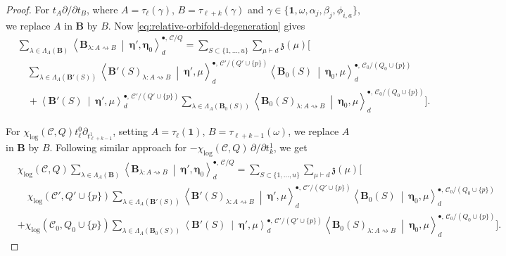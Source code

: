 \documentclass[10pt,a4paper]{amsart}
\newcommand{\cC}{\mathcal C}
\newcommand{\id}{\mathbf 1}
\begin{document}
\begin{proof}
For \(t_A\partial/\partial t_B\), where \(A=\tau_\ell(\gamma)\), \(B=\tau_{\ell+k}(\gamma)\) and
\(\gamma\in\{\id,\omega,\alpha_j,\beta_j,\phi_{i,a}\}\), we replace
\(A\) in \(\mathbf B\) by \(B\).  Now \eqref{eq:relative-orbifold-degeneration} gives
\[
\begin{aligned}
&\sum_{\lambda\in\Lambda_A(\mathbf B)}
 \left\langle\mathbf B_{\lambda:A\rightsquigarrow B}
 \ \middle|\ \boldsymbol\eta',\boldsymbol\eta_0\right\rangle_d^{\bullet,\,\cC/Q}
={}\sum_{S\subset\{1,\ldots,u\}}\sum_{\mu\vdash d}\mathfrak z(\mu)\Bigg[
\\[-2mm]
&\quad\sum_{\lambda\in\Lambda_A(\mathbf B'(S))}
 \left\langle\mathbf B'(S)_{\lambda:A\rightsquigarrow B}
 \ \middle|\ \boldsymbol\eta',\mu\right\rangle_d^{\bullet,\,\cC'/(Q'\cup\{p\})}
 \left\langle\mathbf B_0(S)\ \middle|\ \boldsymbol\eta_0,\mu\right\rangle_d^{\bullet,\,\cC_0/(Q_0\cup\{p\})}
\\[-1mm]
&\quad+\left\langle\mathbf B'(S)\ \middle|\ \boldsymbol\eta',\mu\right\rangle_d^{\bullet,\,\cC'/(Q'\cup\{p\})}
 \sum_{\lambda\in\Lambda_A(\mathbf B_0(S))}
 \left\langle\mathbf B_0(S)_{\lambda:A\rightsquigarrow B}
 \ \middle|\ \boldsymbol\eta_0,\mu\right\rangle_d^{\bullet,\,\cC_0/(Q_0\cup\{p\})}\Bigg].
\end{aligned}
\]

For \(\chi_{\log}(\cC,Q)t^0_\ell\partial_{t^1_{\ell+k-1}}\), setting
\(A=\tau_\ell(\id)\), \(B=\tau_{\ell+k-1}(\omega)\), we replace \(A\) in $\mathbf B$ by \(B\).
Following similar approach for \(-\chi_{\log}(\cC,Q)\,\partial/\partial t^1_k\), we get
\[
\begin{aligned}
&\chi_{\log}(\cC,Q)\sum_{\lambda\in\Lambda_A(\mathbf B)}
 \left\langle\mathbf B_{\lambda:A\rightsquigarrow B}
 \ \middle|\ \boldsymbol\eta',\boldsymbol\eta_0\right\rangle_d^{\bullet,\,\cC/Q}
={}\sum_{S\subset\{1,\ldots,u\}}\sum_{\mu\vdash d}\mathfrak z(\mu)\Bigg[
\\[-2mm]
&\quad\chi_{\log}(\cC',Q'\cup\{p\})
 \sum_{\lambda\in\Lambda_A(\mathbf B'(S))}
 \left\langle\mathbf B'(S)_{\lambda:A\rightsquigarrow B}
 \ \middle|\ \boldsymbol\eta',\mu\right\rangle_d^{\bullet,\,\cC'/(Q'\cup\{p\})}
 \left\langle\mathbf B_0(S)\ \middle|\ \boldsymbol\eta_0,\mu\right\rangle_d^{\bullet,\,\cC_0/(Q_0\cup\{p\})}
\\[-2mm]
&+\chi_{\log}(\cC_0,Q_0\cup\{p\})
 \sum_{\lambda\in\Lambda_A(\mathbf B_0(S))}
 \left\langle\mathbf B'(S)\ \middle|\ \boldsymbol\eta',\mu\right\rangle_d^{\bullet,\,\cC'/(Q'\cup\{p\})}
 \left\langle\mathbf B_0(S)_{\lambda:A\rightsquigarrow B}
 \ \middle|\ \boldsymbol\eta_0,\mu\right\rangle_d^{\bullet,\,\cC_0/(Q_0\cup\{p\})}\Bigg].
\end{aligned}
\]



\end{proof}
\end{document}
